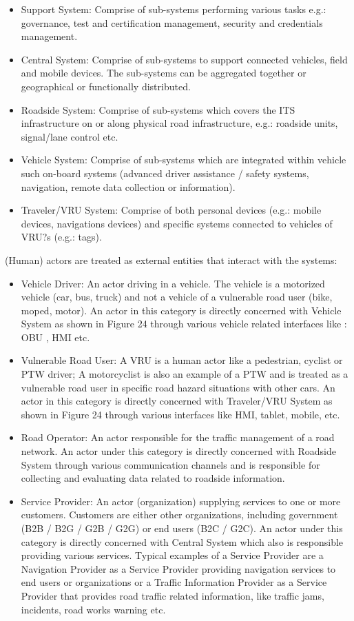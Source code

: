 \documentclass[letterpaper, 10 pt, conference]{ieeeconf}  %
\begin{document}
\begin{itemize}
	\item Support System: Comprise of sub-systems performing various tasks e.g.: governance, test and certification management, security and credentials management.
	\item Central System: Comprise of sub-systems to support connected vehicles, field and mobile devices. The sub-systems can be aggregated together or geographical or functionally distributed.
	\item Roadside System: Comprise of sub-systems which covers the ITS infrastructure on or along physical road infrastructure, e.g.: roadside units, signal/lane control etc.
	\item Vehicle System: Comprise of sub-systems which are integrated within vehicle such on-board systems (advanced driver assistance / safety systems, navigation, remote data collection or information).
	\item Traveler/VRU System: Comprise of both personal devices (e.g.: mobile devices, navigations devices) and specific systems connected to vehicles of VRU?s (e.g.: tags).
\end{itemize}

(Human) actors are treated as external entities that interact with the systems:

\begin{itemize}
	\item Vehicle Driver: An actor driving in a vehicle. The vehicle is a motorized vehicle (car, bus, truck) and not a vehicle of a vulnerable road user (bike, moped, motor). An actor in this category is directly concerned with Vehicle System as shown in Figure 24 through various vehicle related interfaces like : OBU , HMI etc.
	\item Vulnerable Road User: A VRU is a human actor like a pedestrian, cyclist or PTW driver; A motorcyclist is also an example of a PTW and is treated as a vulnerable road user in specific road hazard situations with other cars. An actor in this category is directly concerned with Traveler/VRU System as shown in Figure 24 through various interfaces like HMI, tablet, mobile, etc.
	\item  Road Operator: An actor responsible for the traffic management of a road network. An actor under this category is directly concerned with Roadside System through various communication channels and is responsible for collecting and evaluating data related to roadside information.
	\item Service Provider: An actor (organization) supplying services to one or more customers. Customers are either other organizations, including government (B2B / B2G / G2B / G2G) or end users (B2C / G2C). An actor under this category is directly concerned with Central System which also is responsible providing various services. Typical examples of a Service Provider are a Navigation Provider as a Service Provider providing navigation services to end users or organizations or a Traffic Information Provider as a Service Provider that provides road traffic related information, like traffic jams, incidents, road works warning etc.
\end{itemize}
\end{document}
